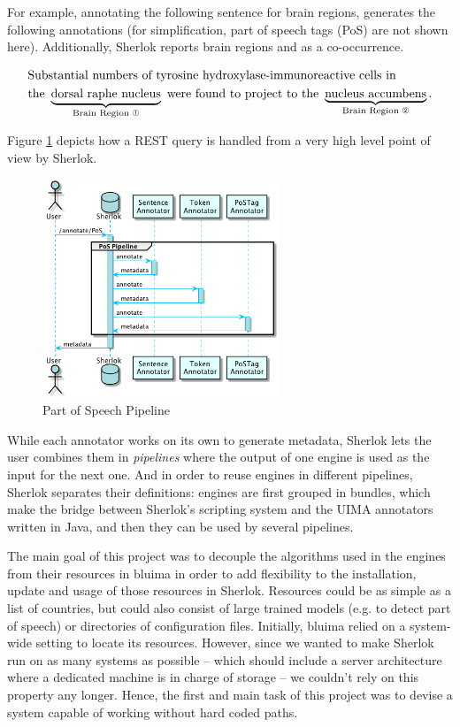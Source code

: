 \documentclass{article}
\newcommand{\ONEWC}{\ding{192}} %
\newcommand{\TWOWC}{\ding{193}} %
\newcommand{\UNDERBRACE}[2]{\underbrace{\text{#1}}_{\mathclap{\text{#2}}}}
\begin{document}
For example, annotating the following sentence for brain regions, generates the following
annotations (for simplification, part of speech tags (PoS) are not shown here). Additionally,
Sherlok reports brain regions \ONEWC\; and \TWOWC\; as a co-occurrence.

\begin{align*}
    & \text{Substantial numbers of tyrosine hydroxylase-immunoreactive cells in}\\
    & \text{the } \UNDERBRACE{dorsal raphe nucleus}{Brain Region \ONEWC}
      \text{ were found to project to the } \UNDERBRACE{nucleus accumbens}{Brain Region \TWOWC}
      \text{.}
\end{align*}

Figure \ref{fig:sherlok_basic_rest_call} depicts how a REST query is handled from a very high level
point of view by Sherlok.

\begin{figure}
    \centering
    \includegraphics[width=200pt]{res/sherlok_basic_rest_call.png}
    \caption{Part of Speech Pipeline}
    \label{fig:sherlok_basic_rest_call}
\end{figure}

While each annotator works on its own to generate metadata, Sherlok lets the user combines them in
\emph{pipelines} where the output of one engine is used as the input for the next one. And in order
to reuse engines in different pipelines, Sherlok separates their definitions: engines are first
grouped in bundles, which make the bridge between Sherlok's scripting system and the UIMA annotators
written in Java, and then they can be used by several pipelines.

The main goal of this project was to decouple the algorithms used in the engines from their
resources in bluima in order to add flexibility to the installation, update and usage of those
resources in Sherlok. Resources could be as simple as a list of countries, but could also consist of
large trained models (e.g. to detect part of speech) or directories of configuration files.
Initially, bluima relied on a system-wide setting to locate its resources.  However, since we wanted
to make Sherlok run on as many systems as possible -- which should include a server architecture
where a dedicated machine is in charge of storage -- we couldn't rely on this property any longer.
Hence, the first and main task of this project was to devise a system capable of working without
hard coded paths.
\end{document}

